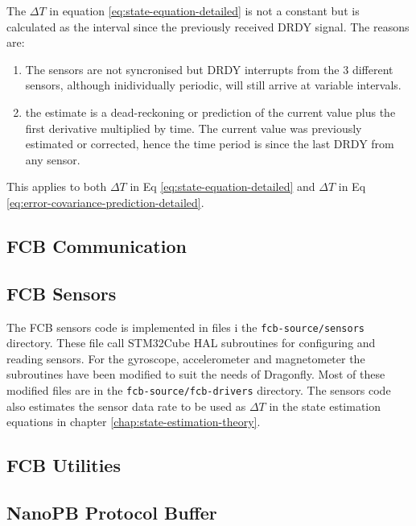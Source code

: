 \documentclass[a4paper]{report}
\begin{document}
The $\Delta T$ in equation \ref{eq:state-equation-detailed} is not a constant but is calculated as the interval since the previously received DRDY signal. The reasons are:
\begin{enumerate}
\item The sensors are not syncronised but DRDY interrupts from the 3 different sensors, although inidividually periodic, will still arrive at variable intervals.
\item the estimate is a dead-reckoning or prediction of the current value plus the first derivative multiplied by time. The current value was previously estimated or corrected, hence the time period is since the last DRDY from any sensor.
\end{enumerate}
This applies to both $\Delta T$ in Eq \ref{eq:state-equation-detailed} and $\Delta T$ in Eq \ref{eq:error-covariance-prediction-detailed}.
		\subsection{FCB Communication}

		\subsection{FCB Sensors}
The FCB sensors code is implemented in files i the \texttt{fcb-source/sensors} directory. These file call STM32Cube HAL subroutines for configuring and reading sensors. For the gyroscope, accelerometer and magnetometer the subroutines have been modified to suit the needs of Dragonfly. Most of these modified files are in the \texttt{fcb-source/fcb-drivers} directory. The sensors code also estimates the sensor data rate to be used as $\Delta T$ in the state estimation equations in chapter \ref{chap:state-estimation-theory}.
		\subsection{FCB Utilities}

		\subsection{NanoPB Protocol Buffer}
\appendix
\end{document}
